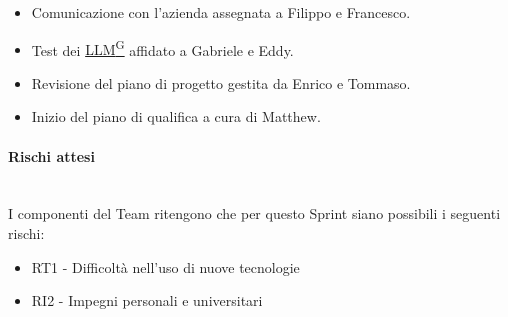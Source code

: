 \documentclass{article}
\begin{document}
\begin{itemize}
\begin{itemize}
                        \item Comunicazione con l'azienda assegnata a Filippo e Francesco.
                        \item Test dei \href{https://code7crusaders.github.io/docs/RTB/documentazione_interna/glossario.html#llm-large-language-model}{LLM\textsuperscript{G}} affidato a Gabriele e Eddy.
                        \item Revisione del piano di progetto gestita da Enrico e Tommaso.
                        \item Inizio del piano di qualifica a cura di Matthew.
                    \end{itemize}
                \end{itemize}


                \paragraph{Rischi attesi}\mbox{}\\
                I componenti del Team ritengono che per questo Sprint siano possibili i seguenti rischi:
                \begin{itemize}
                    \item RT1 - Difficoltà nell’uso di nuove tecnologie
                    \item RI2 - Impegni personali e universitari
                \end{itemize}

\end{document}
